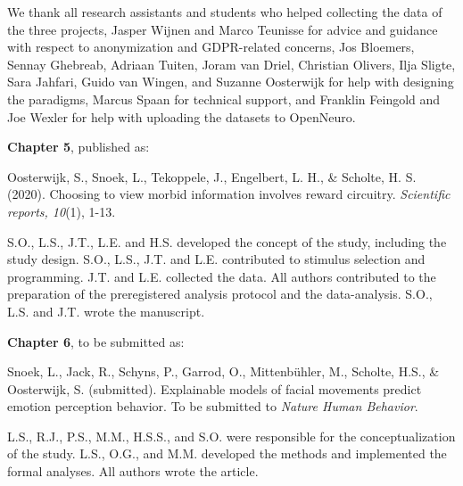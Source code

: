 \documentclass[12pt,american,a4paper,oneside,]{memoir} %
\begin{document}
\vspace{2mm}

We thank all research assistants and students who helped collecting the data of the three projects, Jasper Wijnen and Marco Teunisse for advice and guidance with respect to anonymization and GDPR-related concerns, Jos Bloemers, Sennay Ghebreab, Adriaan Tuiten, Joram van Driel, Christian Olivers, Ilja Sligte, Sara Jahfari, Guido van Wingen, and Suzanne Oosterwijk for help with designing the paradigms, Marcus Spaan for technical support, and Franklin Feingold and Joe Wexler for help with uploading the datasets to OpenNeuro.

\vspace{3mm}

\textbf{Chapter 5}, published as:

\vspace{2mm}

Oosterwijk, S., Snoek, L., Tekoppele, J., Engelbert, L. H., \& Scholte, H. S. (2020). Choosing to view morbid information involves reward circuitry. \emph{Scientific reports, 10}(1), 1-13.

\vspace{2mm}

S.O., L.S., J.T., L.E. and H.S. developed the concept of the study, including the study design. S.O., L.S., J.T. and L.E. contributed to stimulus selection and programming. J.T. and L.E. collected the data. All authors contributed to the preparation of the preregistered analysis protocol and the data-analysis. S.O., L.S. and J.T. wrote the manuscript.

\vspace{3mm}

\textbf{Chapter 6}, to be submitted as:

\vspace{2mm}

Snoek, L., Jack, R., Schyns, P., Garrod, O., Mittenbühler, M., Scholte, H.S., \& Oosterwijk, S. (submitted). Explainable models of facial movements predict emotion perception behavior. To be submitted to \emph{Nature Human Behavior}.

\vspace{2mm}

L.S., R.J., P.S., M.M., H.S.S., and S.O. were responsible for the conceptualization of the study. L.S., O.G., and M.M. developed the methods and implemented the formal analyses. All authors wrote the article.

\vspace{3mm}
\end{document}

